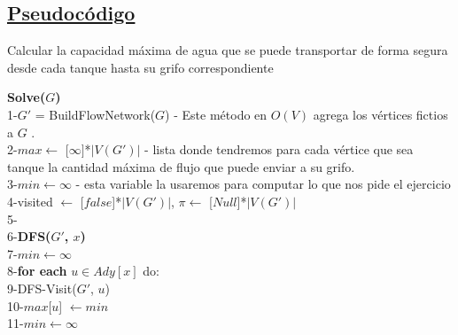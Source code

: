 \documentclass{article}
\begin{document}
    \subsection{\underline{Pseudoc\'odigo}}
    \begin{algorithm}[H]
        \caption{Calcular la capacidad m\'axima de agua que se puede transportar de forma segura desde cada tanque hasta su grifo correspondiente}
        \textbf{Solve($G$)\\}
        1-\hspace*{1em}$G'$ = Build\textunderscore Flow\textunderscore Network($G$) - Este m\'etodo en $O(V)$ agrega los v\'ertices fictios a $G$ .\\
        2-\hspace*{1em}$max \leftarrow$ [$\infty]$*$|V(G')|$ - lista donde tendremos para cada v\'ertice que sea tanque la cantidad m\'axima de flujo que puede enviar a su grifo.\\
        3-\hspace*{1em}$min \leftarrow \infty$ - esta variable la usaremos para computar lo que nos pide el ejercicio\\
        4-\hspace*{1em}visited $\leftarrow$ [$false$]*$|V(G')|$, $\pi \leftarrow$ [$Null$]*$|V(G')|$\\
        5-\hspace*{1em}\\
        6-\hspace*{1em}\textbf{DFS($G'$, $x$)}\\
        7-\hspace*{2em}$min \leftarrow \infty$\\
        8-\hspace*{2em}\textbf{for each} $u \in Ady[x]$ do:\\
        9-\hspace*{3em}DFS-Visit($G'$, $u$)\\
        10-\hspace*{3em}$max$[$u$] $\leftarrow min$\\
        11-\hspace*{3em}$min \leftarrow \infty$\\


\end{algorithm}
\end{document}
